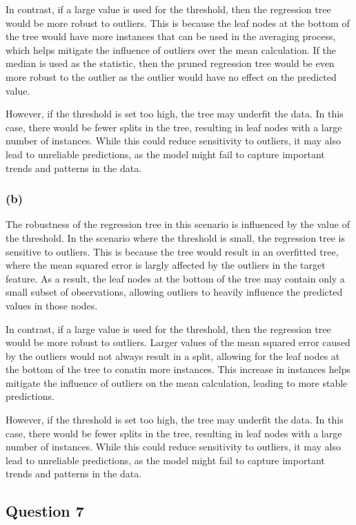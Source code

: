 \documentclass[10pt]{article}
\begin{document}
In contrast, if a large value is used for the threshold, then the regression tree would be more robust to outliers.
This is because the leaf nodes at the bottom of the tree would have more instances that can be used in the averaging process,
which helps mitigate the influence of outliers over the mean calculation. If the median is used as the statistic, then
the pruned regression tree would be even more robust to the outlier as the outlier would have no effect on the
predicted value.

However, if the threshold is set too high, the tree may underfit the data. In this case, there would be fewer splits in
the tree, resulting in leaf nodes with a large number of instances. While this could reduce sensitivity to outliers, it may
also lead to unreliable predictions, as the model might fail to capture important trends and patterns in the data.

\subsubsection*{(b)}

The robustness of the regression tree in this scenario is influenced by the value of the threshold.
In the scenario where the threshold is small, the regression tree is sensitive to outliers. This is because
the tree would result in an overfitted tree, where the mean squared error is largly affected by the outliers
in the target feature. As a result, the leaf nodes at the bottom of the tree may contain only a small subset of observations,
allowing outliers to heavily influence the predicted values in those nodes.

In contrast, if a large value is used for the threshold, then the regression tree would be more robust to outliers.
Larger values of the mean squared error caused by the outliers would not always result in a split, allowing for the
leaf nodes at the bottom of the tree to conatin more instances.
This increase in instances helps mitigate the influence of outliers on the mean calculation, leading to more stable predictions.

However, if the threshold is set too high, the tree may underfit the data. In this case, there would be fewer splits in
the tree, resulting in leaf nodes with a large number of instances. While this could reduce sensitivity to outliers, it may
also lead to unreliable predictions, as the model might fail to capture important trends and patterns in the data.

\subsection*{Question 7}
\end{document}
